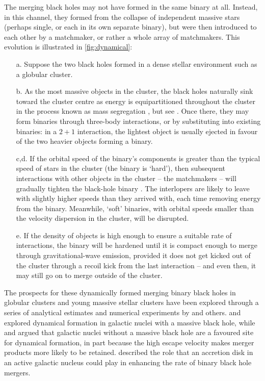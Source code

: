 \documentclass[review]{elsarticle}
\begin{document}
The merging black holes may not have formed in the same binary at all.  Instead, in this channel, they formed from the collapse of independent massive stars (perhaps single, or each in its own separate binary), but were then introduced to each other by a matchmaker, or rather a whole array of matchmakers.   This evolution is illustrated in \autoref{fig:dynamical}: 
\begin{enumerate}
\item[a.] Suppose the two black holes formed in a dense stellar environment such as a globular cluster.  
\item[b.] As the most massive objects in the cluster, the black holes naturally sink toward the cluster centre as energy is equipartitioned throughout the cluster in the process known as mass segregation \citep{Spitzer:1969,BinneyTremaine}, but see \citep{Trenti:2013}.  Once there, they may form binaries through three-body interactions, or by substituting into existing binaries: in a $2+1$ interaction, the lightest object is usually ejected in favour of the two heavier objects forming a binary.  
\item[c,d.] If the orbital speed of the binary's components is greater than the typical speed of stars in the cluster (the binary is `hard'), then subsequent interactions with other objects in the cluster -- the matchmakers -- will gradually tighten the black-hole binary \citep{Heggie:1975}. The interlopers are likely to leave with slightly higher speeds than they arrived with, each time removing energy from the binary.   Meanwhile, `soft' binaries, with orbital speeds smaller than the velocity dispersion in the cluster, will be disrupted. 
\item[e.] If the density of objects is high enough to ensure a suitable rate of interactions, the binary will be hardened until it is compact enough to merge through gravitational-wave emission, provided it does not get kicked out of the cluster through a recoil kick from the last interaction -- and even then, it may still go on to merge outside of the cluster.  
\end{enumerate}

The prospects for these dynamically formed merging binary black holes in globular clusters and young massive stellar clusters have been explored through a series of analytical estimates and numerical experiments by \cite{Sigurdsson:1993,Kulkarni:1993,PZwart:2000,OLeary:2006,Banerjee:2010,Downing:2011,Morscher:2015,Mapelli:2016,Rodriguez:2016,Park:2017,FragioneKocsis:2018} and others.  \citet{OLeary:2008} \citep[but see][]{Tsang:2013} and \citet{AntoniniPerets:2012} explored dynamical formation in galactic nuclei with a massive black hole, while \citet{MillerLauburg:2008} and \citet{AntoniniRasio:2016} argued that galactic nuclei without a massive black hole are a favoured site for dynamical formation, in part because the high escape velocity makes merger products more likely to be retained.  \citet{Bellovary:2016, Bartos:2016, Stone:2016, McKernan:2018, Tagawa:2020} described the role that an accretion disk in an active galactic nucleus could play in enhancing the rate of binary black hole mergers.
\end{document}
